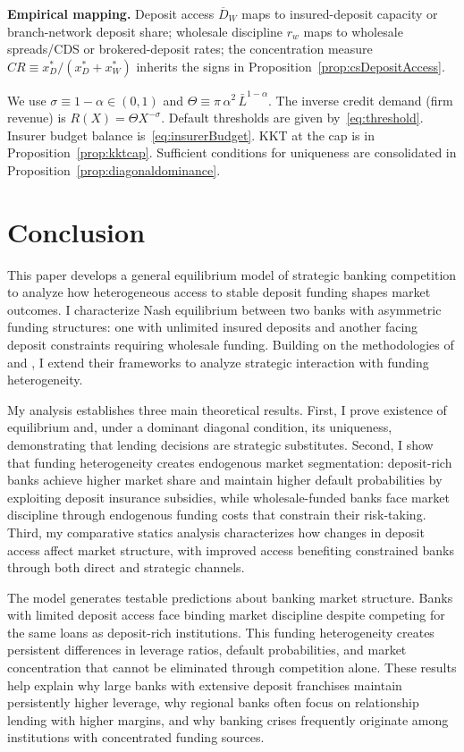 \documentclass[12pt]{article}
\begin{document}
\noindent\textbf{Empirical mapping.} Deposit access $\overline D_W$ maps to insured-deposit capacity or branch-network deposit share; wholesale discipline $r_w$ maps to wholesale spreads/CDS or brokered-deposit rates; the concentration measure $CR\equiv x_D^*/(x_D^*+x_W^*)$ inherits the signs in Proposition~\ref{prop:csDepositAccess}.

\begin{remark}\label{rem:notation}
We use $\sigma\equiv 1-\alpha\in(0,1)$ and $\Theta\equiv \pi\,\alpha^2\,\bar L^{1-\alpha}$. The inverse credit demand (firm revenue) is $R(X)=\Theta X^{-\sigma}$. Default thresholds are given by~\eqref{eq:threshold}. Insurer budget balance is~\eqref{eq:insurerBudget}. KKT at the cap is in Proposition~\ref{prop:kktcap}. Sufficient conditions for uniqueness are consolidated in Proposition~\ref{prop:diagonaldominance}.
\end{remark}

\section{Conclusion}
This paper develops a general equilibrium model of strategic banking competition to analyze how heterogeneous access to stable deposit funding shapes market outcomes. I characterize Nash equilibrium between two banks with asymmetric funding structures: one with unlimited insured deposits and another facing deposit constraints requiring wholesale funding. Building on the methodologies of \citet{Malherbe2020} and \citet{BahajMalherbe2020}, I extend their frameworks to analyze strategic interaction with funding heterogeneity.

My analysis establishes three main theoretical results. First, I prove existence of equilibrium and, under a dominant diagonal condition, its uniqueness, demonstrating that lending decisions are strategic substitutes. Second, I show that funding heterogeneity creates endogenous market segmentation: deposit-rich banks achieve higher market share and maintain higher default probabilities by exploiting deposit insurance subsidies, while wholesale-funded banks face market discipline through endogenous funding costs that constrain their risk-taking. Third, my comparative statics analysis characterizes how changes in deposit access affect market structure, with improved access benefiting constrained banks through both direct and strategic channels.

The model generates testable predictions about banking market structure. Banks with limited deposit access face binding market discipline despite competing for the same loans as deposit-rich institutions. This funding heterogeneity creates persistent differences in leverage ratios, default probabilities, and market concentration that cannot be eliminated through competition alone. These results help explain why large banks with extensive deposit franchises maintain persistently higher leverage, why regional banks often focus on relationship lending with higher margins, and why banking crises frequently originate among institutions with concentrated funding sources.
\end{document}
